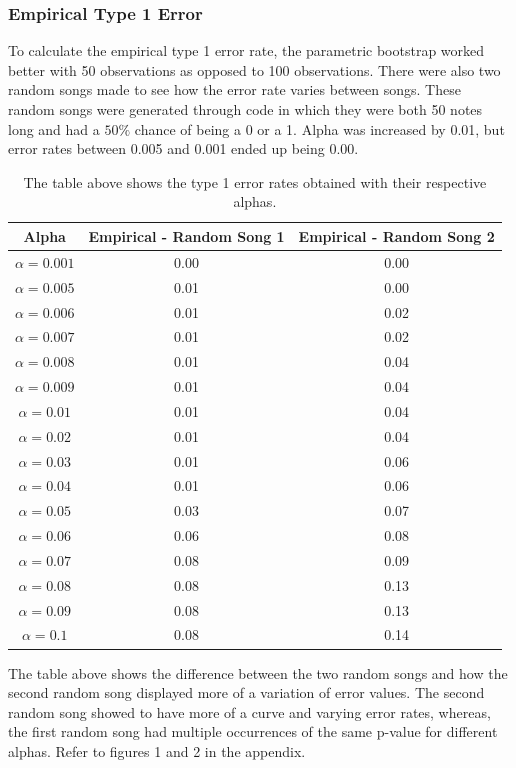 \documentclass[12pt, letterpaper]{article}
\begin{document}
\subsubsection{Empirical Type 1 Error} 
To calculate the empirical type 1 error rate, the parametric bootstrap worked better with 50 observations as opposed to 100 observations.  There were also two random songs made to see how the error rate varies between songs. These random songs were generated through code in which they were both 50 notes long and had a $50\%$ chance of being a 0 or a 1. Alpha was increased by 0.01, but error rates between 0.005 and 0.001 ended up being 0.00. 
\begin{table}[!h]
\begin{center}
\begin{tabular}{|c|c|c|}
\hline
\textbf{Alpha} & \textbf{Empirical - Random Song 1} & \textbf{Empirical - Random Song 2} \\
\hline
$\alpha = 0.001$ & 0.00 & 0.00\\
$\alpha = 0.005$ &  0.01 & 0.00\\
$\alpha = 0.006$ &  0.01 & 0.02\\
$\alpha = 0.007$ & 0.01 & 0.02\\
$\alpha = 0.008$ & 0.01 & 0.04\\
$\alpha = 0.009$ & 0.01 & 0.04\\
$\alpha = 0.01$ & 0.01 & 0.04\\
$\alpha = 0.02$ & 0.01 & 0.04\\
$\alpha = 0.03$ & 0.01 & 0.06\\
$\alpha = 0.04$ & 0.01 & 0.06\\
$\alpha = 0.05$ &  0.03 & 0.07\\
$\alpha = 0.06$ &  0.06 & 0.08\\
$\alpha = 0.07$ &  0.08 & 0.09\\
$\alpha = 0.08$ &  0.08 & 0.13\\
$\alpha = 0.09$ & 0.08 & 0.13\\
$\alpha = 0.1$ & 0.08 & 0.14\\
\hline
\end{tabular}
\end{center}
\caption{The table above shows the type 1 error rates obtained with their respective alphas.}
\label{fig: Type 1 Error Rates for Parametric Bootstrap}
\end{table}
The table above shows the difference between the two random songs and how the second random song displayed more of a variation of error values.  The second random song showed to have more of a curve and varying error rates, whereas, the first random song had multiple occurrences of the same p-value for different alphas. Refer to figures 1 and 2 in the appendix.
\end{document}
